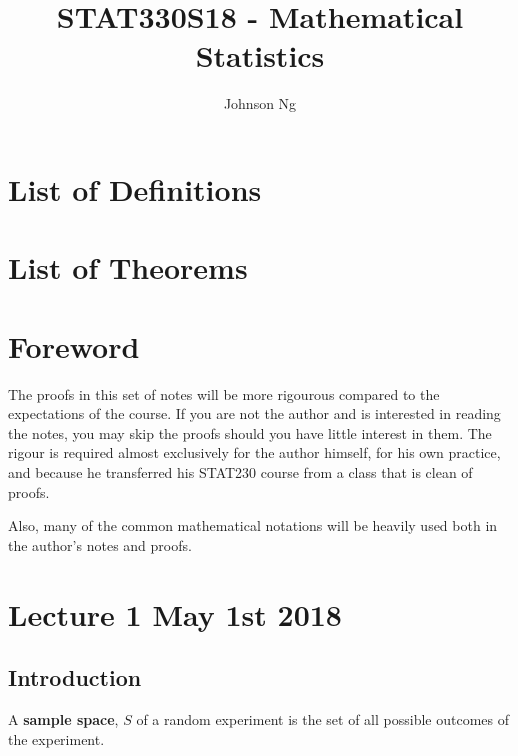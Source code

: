 \documentclass[notoc,notitlepage]{tufte-book}
\title{STAT330S18 - Mathematical Statistics}
\author{Johnson Ng}
\begin{document}
\hypersetup{pageanchor=false}
\maketitle
\hypersetup{pageanchor=true}
\tableofcontents

\chapter*{List of Definitions}

\chapter*{List of Theorems}

\chapter*{Foreword}
  \label{chapter:foreword}

\begin{fullwidth}
The proofs in this set of notes will be more rigourous compared to the expectations of the course. If you are not the author and is interested in reading the notes, you may skip the proofs should you have little interest in them. The rigour is required almost exclusively for the author himself, for his own practice, and because he transferred his STAT230 course from a class that is clean of proofs.

Also, many of the common mathematical notations will be heavily used both in the author's notes and proofs.
\end{fullwidth}


\chapter{Lecture 1 May 1st 2018}
  \label{chapter:lecture_1_may_1st_2018}

\section{Introduction} %
\label{sec:introduction}

\begin{defn}\label{defn:sample_space}
  A \textbf{sample space}, \textbf{$S$} of a random experiment is the set of all possible outcomes of the experiment.
\end{defn}
\end{document}

